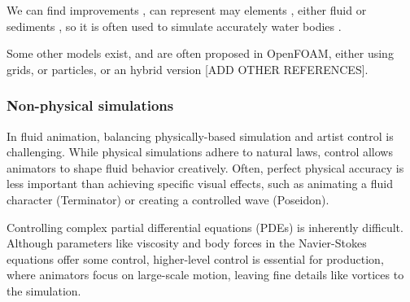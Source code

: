 
We can find improvements \cite{Roose2011}, can represent may elements \cite{Iwasaki2010}, either fluid or sediments \cite{Lenaerts2009}, so it is often used to simulate accurately water bodies \cite{Nikeghabali2018}.

Some other models exist, and are often proposed in OpenFOAM, either using grids, or particles, or an hybrid version \cite{Caretto1973} [ADD OTHER REFERENCES]. 

\subsubsection{Non-physical simulations}
In fluid animation, balancing physically-based simulation and artist control is challenging. While physical simulations adhere to natural laws, control allows animators to shape fluid behavior creatively. Often, perfect physical accuracy is less important than achieving specific visual effects, such as animating a fluid character (Terminator) or creating a controlled wave (Poseidon).

Controlling complex partial differential equations (PDEs) is inherently difficult. Although parameters like viscosity and body forces in the Navier-Stokes equations offer some control, higher-level control is essential for production, where animators focus on large-scale motion, leaving fine details like vortices to the simulation.

